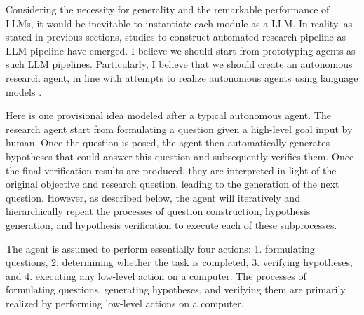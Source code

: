 Considering the necessity for generality and the remarkable performance of LLMs, it would be inevitable to instantiate each module as a LLM. In reality, as stated in previous sections, studies to construct automated research pipeline as LLM pipeline have emerged. I believe we should start from prototyping agents as such LLM pipelines. Particularly, I believe that we should create an autonomous research agent, in line with attempts to realize autonomous agents using language models \cite{wang2023survey,xi2023rise}.

Here is one provisional idea modeled after a typical autonomous agent. The research agent start from formulating a question given a high-level goal input by human. Once the question is posed, the agent then automatically generates hypotheses that could answer this question and subsequently verifies them. Once the final verification results are produced, they are interpreted in light of the original objective and research question, leading to the generation of the next question. However, as described below, the agent will iteratively and hierarchically repeat the processes of question construction, hypothesis generation, and hypothesis verification to execute each of these subprocesses.

The agent is assumed to perform essentially four actions: 1. formulating questions, 2. determining whether the task is completed, 3. verifying hypotheses, and 4. executing any low-level action on a computer. The processes of formulating questions, generating hypotheses, and verifying them are primarily realized by performing low-level actions on a computer.


